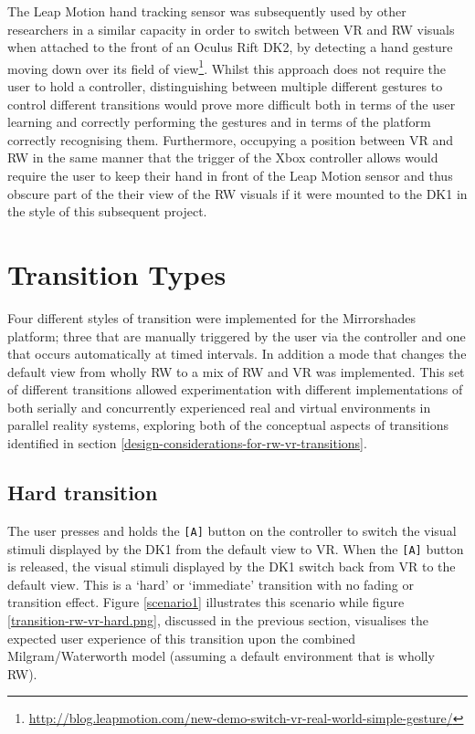 The Leap Motion hand tracking sensor was subsequently used by other researchers in a similar capacity in order to switch between VR and RW visuals when attached to the front of an Oculus Rift DK2, by detecting a hand gesture moving down over its field of view\footnote{\url{http://blog.leapmotion.com/new-demo-switch-vr-real-world-simple-gesture/}}. Whilst this approach does not require the user to hold a controller, distinguishing between multiple different gestures to control different transitions would prove more difficult both in terms of the user learning and correctly performing the gestures and in terms of the platform correctly recognising them. Furthermore, occupying a position between VR and RW in the same manner that the trigger of the Xbox controller allows would require the user to keep their hand in front of the Leap Motion sensor and thus obscure part of the their view of the RW visuals if it were mounted to the DK1 in the style of this subsequent project.


\section{Transition Types}

Four different styles of transition were implemented for the Mirrorshades platform; three that are manually triggered by the user via the controller and one that occurs automatically at timed intervals. In addition a mode that changes the default view from wholly RW to a mix of RW and VR was implemented. This set of different transitions allowed experimentation with different implementations of both serially and concurrently experienced real and virtual environments in parallel reality systems, exploring both of the conceptual aspects of transitions identified in section \ref{design-considerations-for-rw-vr-transitions}.


\subsection{Hard transition}
\label{sub-hardswitch}
The user presses and holds the \texttt{[A]} button on the controller to switch the visual stimuli displayed by the DK1 from the default view to VR. When the \texttt{[A]} button is released, the visual stimuli displayed by the DK1 switch back from VR to the default view. This is a `hard' or `immediate' transition with no fading or transition effect. Figure \ref{scenario1} illustrates this scenario while figure \ref{transition-rw-vr-hard.png}, discussed in the previous section, visualises the expected user experience of this transition upon the combined Milgram/Waterworth model (assuming a default environment that is wholly RW).

